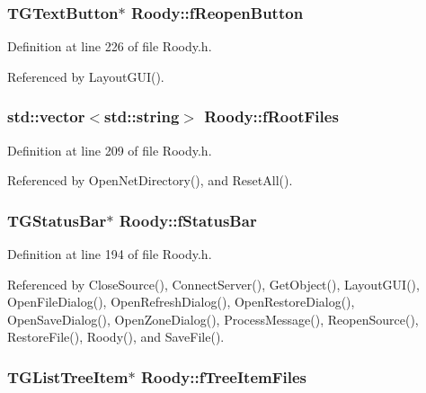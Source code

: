 \subsubsection[{fReopenButton}]{\setlength{\rightskip}{0pt plus 5cm}TGTextButton$\ast$ {\bf Roody::fReopenButton}\hspace{0.3cm}{\ttfamily  [private]}}\label{classRoody_add443a1d9618e0e979bb549ecba9ad22}


Definition at line 226 of file Roody.h.



Referenced by LayoutGUI().

\subsubsection[{fRootFiles}]{\setlength{\rightskip}{0pt plus 5cm}std::vector$<$std::string$>$ {\bf Roody::fRootFiles}\hspace{0.3cm}{\ttfamily  [private]}}\label{classRoody_a9550c2c6ac4c5099ac70b98d670e6031}


Definition at line 209 of file Roody.h.



Referenced by OpenNetDirectory(), and ResetAll().

\subsubsection[{fStatusBar}]{\setlength{\rightskip}{0pt plus 5cm}TGStatusBar$\ast$ {\bf Roody::fStatusBar}\hspace{0.3cm}{\ttfamily  [private]}}\label{classRoody_a92d8f0eb283ec9c065ce5a5cebe26d8e}


Definition at line 194 of file Roody.h.



Referenced by CloseSource(), ConnectServer(), GetObject(), LayoutGUI(), OpenFileDialog(), OpenRefreshDialog(), OpenRestoreDialog(), OpenSaveDialog(), OpenZoneDialog(), ProcessMessage(), ReopenSource(), RestoreFile(), Roody(), and SaveFile().

\subsubsection[{fTreeItemFiles}]{\setlength{\rightskip}{0pt plus 5cm}TGListTreeItem$\ast$ {\bf Roody::fTreeItemFiles}\hspace{0.3cm}{\ttfamily  [protected]}}\label{classRoody_a205b6f9dccb6bd42fb62bd00e5cc304d}


